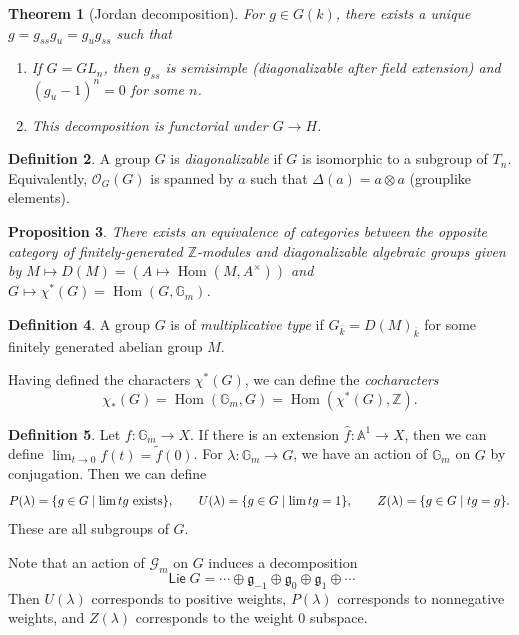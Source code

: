 \documentclass[leqno, openany]{memoir}
\newtheorem{thm}{Theorem}[section]
\newtheorem{prop}[thm]{Proposition}
\theoremstyle{definition}
\newtheorem{defn}[thm]{Definition}
\theoremstyle{remark}
\theoremstyle{plain}
\theoremstyle{definition}
\theoremstyle{remark}
\newcommand{\A}{\mathbb{A}}
\newcommand{\Z}{\mathbb{Z}}
\newcommand{\mc}[1]{\mathcal{#1}}
\newcommand{\mf}[1]{\mathfrak{#1}}
\newcommand{\on}[1]{\operatorname{#1}}
\newcommand{\ms}[1]{\mathsf{#1}}
\newcommand{\ol}[1]{\overline{#1}}
\newcommand{\wt}[1]{\widetilde{#1}}
\newcommand{\wh}[1]{\widehat{#1}}
\DeclareMathOperator{\Hom}{Hom}
\begin{document}
\begin{thm}[Jordan decomposition]
    For $g \in G(k)$, there exists a unique $g = g_{ss} g_u = g_u g_{ss}$ such that
    \begin{enumerate}
        \item If $G = GL_n$, then $g_{ss}$ is semisimple (diagonalizable after field extension) and $(g_u-1)^n = 0$ for some $n$.
        \item This decomposition is functorial under $G \to H$.
    \end{enumerate}
\end{thm}

\begin{defn}
    A group $G$ is \textit{diagonalizable} if $G$ is isomorphic to a subgroup of $T_n$. Equivalently, $\mc{O}_G(G)$ is spanned by $a$ such that $\Delta (a) = a \otimes a$ (grouplike elements).
\end{defn}

\begin{prop}
    There exists an equivalence of categories between the opposite category of finitely-generated $\Z$-modules and diagonalizable algebraic groups given by $M \mapsto D(M) = (A \mapsto \Hom(M, A^{\times}))$ and $G \mapsto \chi^*(G) = \Hom(G, \mathbb{G}_m)$.
\end{prop}

\begin{defn}
    A group $G$ is of \textit{multiplicative type} if $G_{\ol{k}} = D(M)_{\ol{k}}$ for some finitely generated abelian group $M$.
\end{defn}

Having defined the characters $\chi^*(G)$, we can define the \textit{cocharacters} 
\[ \chi_* (G) = \Hom(\mathbb{G}_m, G) = \Hom(\chi^*(G), \Z). \]

\begin{defn}
    Let $f \colon \mathbb{G}_m \to X$. If there is an extension $\wh{f} \colon \A^1 \to X$, then we can define $\lim_{t \to 0} f(t) = \wt{f}(0)$. For $\lambda \colon \mathbb{G}_m \to G$, we have an action of $\mathbb{G}_m$ on $G$ by conjugation. Then we can define
    \[ P(\lambda) = \qty{g \in G \mid \lim tg \text{ exists}}, \qquad U(\lambda) = \qty{g \in G \mid \lim tg = 1}, \qquad Z(\lambda) = \qty{g \in G \mid tg = g}. \]
    These are all subgroups of $G$.
\end{defn}

Note that an action of $\mc{G}_m$ on $G$ induces a decomposition
\[ \on{\ms{Lie}} G = \cdots \oplus \mf{g}_{-1} \oplus \mf{g}_0 \oplus \mf{g}_1 \oplus \cdots \]
Then $U(\lambda)$ corresponds to positive weights, $P(\lambda)$ corresponds to nonnegative weights, and $Z(\lambda)$ corresponds to the weight $0$ subspace.
\end{document}
